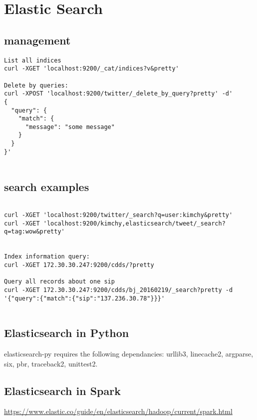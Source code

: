 \section{Elastic Search}

\subsection{management}
\begin{verbatim}
List all indices
curl -XGET 'localhost:9200/_cat/indices?v&pretty'

Delete by queries:
curl -XPOST 'localhost:9200/twitter/_delete_by_query?pretty' -d'
{
  "query": { 
    "match": {
      "message": "some message"
    }
  }
}'


\end{verbatim}

\subsection{search examples}
\begin{verbatim}

curl -XGET 'localhost:9200/twitter/_search?q=user:kimchy&pretty'
curl -XGET 'localhost:9200/kimchy,elasticsearch/tweet/_search?q=tag:wow&pretty'


Index information query:
curl -XGET 172.30.30.247:9200/cdds/?pretty

Query all records about one sip
curl -XGET 172.30.30.247:9200/cdds/bj_20160219/_search?pretty -d '{"query":{"match":{"sip":"137.236.30.78"}}}'


\end{verbatim}

\subsection{Elasticsearch in Python}
elasticsearch-py requires the following dependancies: urllib3, linecache2,
argparse, six, pbr, traceback2, unittest2.



\subsection{Elasticsearch in Spark}

\url{https://www.elastic.co/guide/en/elasticsearch/hadoop/current/spark.html}


















